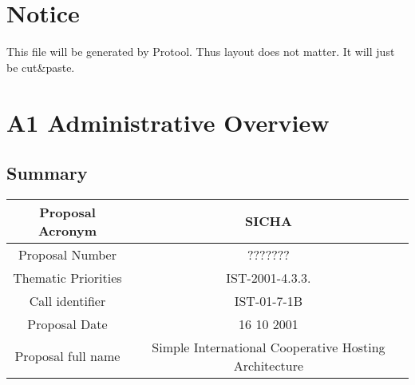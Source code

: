 \documentclass[a4paper,11pt]{report}
\begin{document}
\section*{Notice}
This file will be generated by Protool. Thus layout does not matter. It will
just be cut\&paste.
\section*{A1 Administrative Overview}
\subsection*{Summary}
\begin{tabular}{|c|c|}
\hline
Proposal Acronym &  SICHA \\ \hline
Proposal Number &  ??????? \\ \hline
Thematic Priorities & IST-2001-4.3.3. \\ \hline
Call identifier & IST-01-7-1B\\ \hline
Proposal Date & 16 10 2001 \\ \hline
Proposal full name & Simple International Cooperative Hosting Architecture \\ \hline
\end{tabular}
\end{document}
